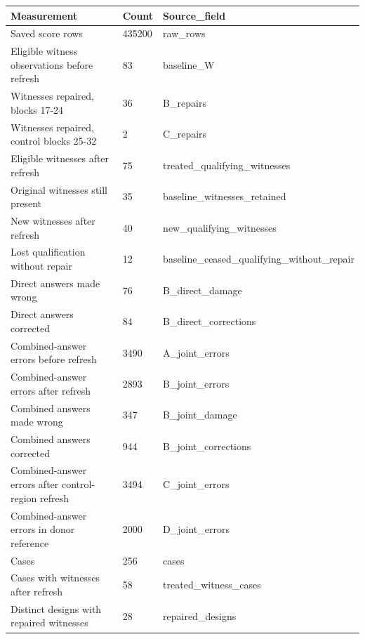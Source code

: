\begin{tabular}{lll}
Measurement & Count & Source\_field \\
\hline
Saved score rows & 435200 & raw\_rows \\
Eligible witness observations before refresh & 83 & baseline\_W \\
Witnesses repaired, blocks 17-24 & 36 & B\_repairs \\
Witnesses repaired, control blocks 25-32 & 2 & C\_repairs \\
Eligible witnesses after refresh & 75 & treated\_qualifying\_witnesses \\
Original witnesses still present & 35 & baseline\_witnesses\_retained \\
New witnesses after refresh & 40 & new\_qualifying\_witnesses \\
Lost qualification without repair & 12 & baseline\_ceased\_qualifying\_without\_repair \\
Direct answers made wrong & 76 & B\_direct\_damage \\
Direct answers corrected & 84 & B\_direct\_corrections \\
Combined-answer errors before refresh & 3490 & A\_joint\_errors \\
Combined-answer errors after refresh & 2893 & B\_joint\_errors \\
Combined answers made wrong & 347 & B\_joint\_damage \\
Combined answers corrected & 944 & B\_joint\_corrections \\
Combined-answer errors after control-region refresh & 3494 & C\_joint\_errors \\
Combined-answer errors in donor reference & 2000 & D\_joint\_errors \\
Cases & 256 & cases \\
Cases with witnesses after refresh & 58 & treated\_witness\_cases \\
Distinct designs with repaired witnesses & 28 & repaired\_designs \\
\end{tabular}

